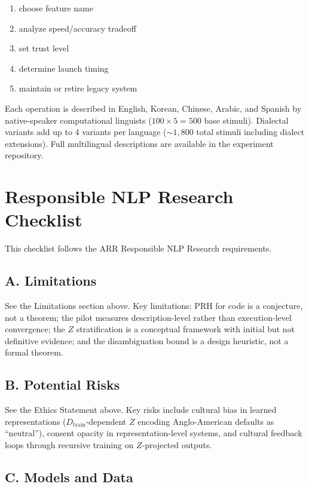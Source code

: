\documentclass[11pt]{article}
\theoremstyle{definition}
\newcommand{\Dtrain}{D_{\text{train}}}
\begin{document}
\begin{enumerate}[nosep]
politely \item choose feature name \item analyze speed/accuracy tradeoff \item set trust level \item determine launch timing \item maintain or retire legacy system
\end{enumerate}
\normalsize

Each operation is described in English, Korean, Chinese, Arabic, and Spanish by native-speaker computational linguists ($100 \times 5 = 500$ base stimuli). Dialectal variants add up to 4 variants per language (${\sim}1{,}800$ total stimuli including dialect extensions). Full multilingual descriptions are available in the experiment repository.


\section*{Responsible NLP Research Checklist}

This checklist follows the ARR Responsible NLP Research requirements.

\subsection*{A. Limitations}
See the Limitations section above. Key limitations: PRH for code is a conjecture, not a theorem; the pilot measures description-level rather than execution-level convergence; the $Z$ stratification is a conceptual framework with initial but not definitive evidence; and the disambiguation bound is a design heuristic, not a formal theorem.

\subsection*{B. Potential Risks}
See the Ethics Statement above. Key risks include cultural bias in learned representations ($\Dtrain$-dependent $Z$ encoding Anglo-American defaults as ``neutral''), consent opacity in representation-level systems, and cultural feedback loops through recursive training on $Z$-projected outputs.

\subsection*{C. Models and Data}
\end{document}
